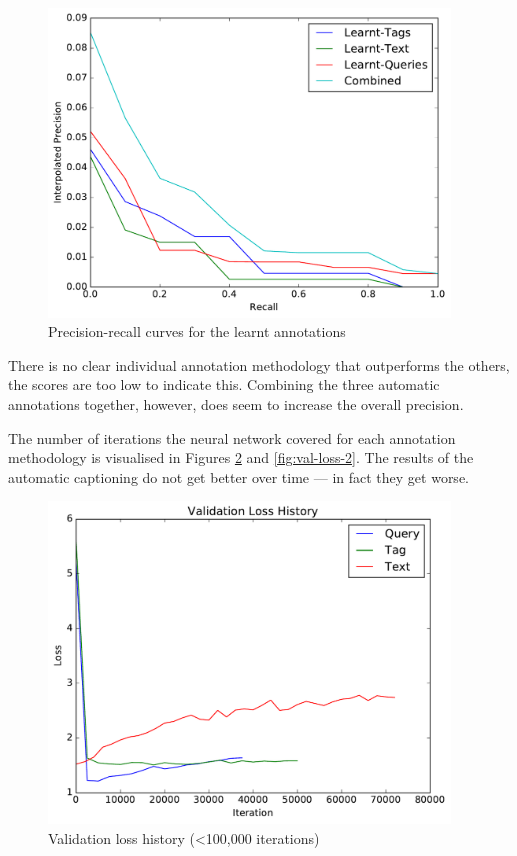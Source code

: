 \begin{figure}[h]
    \centering
    \includegraphics[width=0.95\textwidth]{graphs/learnt-result}
    \caption{Precision-recall curves for the learnt annotations}
    \label{fig:manual-result}
\end{figure}

There is no clear individual annotation methodology that outperforms the others, the scores are too low to indicate this. Combining the three automatic annotations together, however, does seem to increase the overall precision.

\FloatBarrier
The number of iterations the neural network covered for each annotation methodology is visualised in Figures \ref{fig:val-loss-1} and \ref{fig:val-loss-2}. The results of the automatic captioning do not get better over time --- in fact they get worse.

\begin{figure}[h]
    \centering
    \includegraphics[width=0.95\textwidth]{graphs/initial-validation-loss-history}
    \caption{Validation loss history (\textless 100,000 iterations)}
    \label{fig:val-loss-1}
\end{figure}

